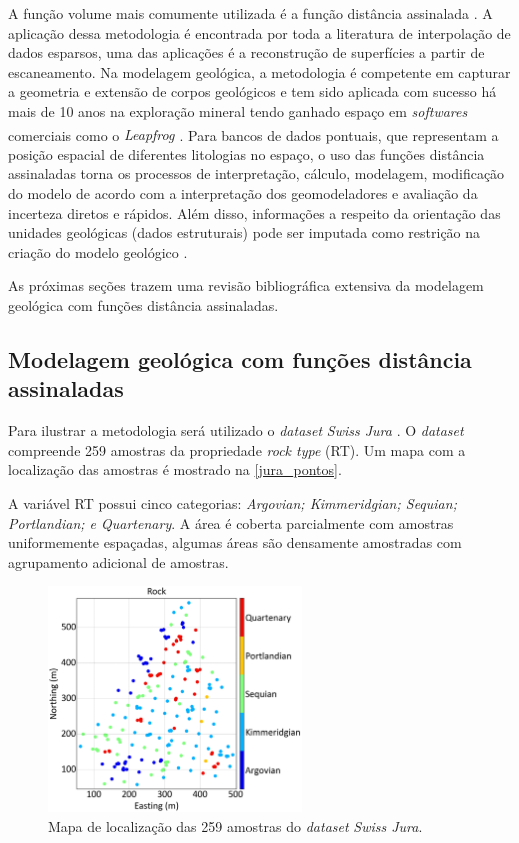 A função volume mais comumente utilizada é a função distância assinalada \cite{osherlevelsetmethods}. A aplicação dessa metodologia é encontrada por toda a literatura de interpolação de dados esparsos, uma das aplicações é a reconstrução de superfícies a partir de escaneamento. Na modelagem geológica, a metodologia é competente em capturar a geometria e extensão de corpos geológicos e tem sido aplicada com sucesso há mais de 10 anos na exploração mineral tendo ganhado espaço em \textit{softwares} comerciais como o \textit{Leapfrog \textsuperscript{\textregistered}}. Para bancos de dados pontuais, que representam a posição espacial de diferentes litologias no espaço, o uso das funções distância assinaladas torna os processos de interpretação, cálculo, modelagem, modificação do modelo de acordo com a interpretação dos geomodeladores e avaliação da incerteza diretos e rápidos. Além disso, informações a respeito da orientação das unidades geológicas (dados estruturais) pode ser imputada como restrição na criação do modelo geológico \cite{martin2017implicitmodeling}.

As próximas seções trazem uma revisão bibliográfica extensiva da modelagem geológica com funções distância assinaladas.

\subsection{Modelagem geológica com funções distância assinaladas}

Para  ilustrar a metodologia será utilizado o \textit{dataset} \textit{Swiss Jura} \cite{goovaerts1997geostatistics}. O \textit{dataset} compreende 259 amostras da propriedade \textit{rock type} (RT). Um mapa com a localização das amostras é mostrado na \autoref{jura_pontos}.

A variável RT possui cinco categorias: \textit{Argovian; Kimmeridgian; Sequian;
Portlandian; e Quartenary}. A área é coberta parcialmente com amostras uniformemente espaçadas, algumas áreas são densamente amostradas com agrupamento adicional de amostras.

\begin{figure}[H]
	\centering
	\caption{\label{jura_pontos}Mapa de localização das 259 amostras do \textit{dataset} \textit{Swiss Jura}.}
	\includegraphics[width=0.6\textwidth]{capitulo_2/imagens/points.png}
\end{figure}


